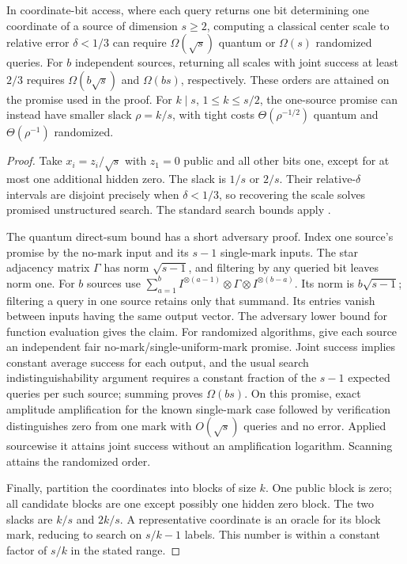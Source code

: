 \begin{proposition}
\label{newt:scale}
In coordinate-bit access, where each query returns one bit determining
one coordinate of a source of dimension $s\geq2$, computing a classical
center scale to relative error $\delta<1/3$ can require
$\Omega(\sqrt s)$ quantum or $\Omega(s)$ randomized queries.
For $b$ independent sources, returning all scales with joint success at
least $2/3$ requires $\Omega(b\sqrt s)$ and $\Omega(bs)$,
respectively.  These orders are attained on the promise used in the proof.
For $k\mid s$, $1\leq k\leq s/2$, the one-source promise can instead
have smaller slack $\rho=k/s$, with tight costs
$\Theta(\rho^{-1/2})$ quantum and $\Theta(\rho^{-1})$ randomized.
\end{proposition}
\begin{proof}
Take $x_i=z_i/\sqrt s$ with $z_1=0$ public and all other bits one,
except for at most one additional hidden zero.  The slack is $1/s$ or
$2/s$.  Their relative-$\delta$ intervals are disjoint precisely when
$\delta<1/3$, so recovering the scale solves promised unstructured
search.  The standard search bounds apply \citep{BBBV1997,BHMT2002}.

The quantum direct-sum bound has a short adversary proof.  Index
one source's promise by the no-mark input and its $s-1$ single-mark
inputs.  The star adjacency matrix $\Gamma$ has norm $\sqrt{s-1}$,
and filtering by any queried bit leaves norm one.  For $b$ sources use
$\sum_{a=1}^b I^{\otimes(a-1)}\otimes\Gamma\otimes
I^{\otimes(b-a)}$.  Its norm is $b\sqrt{s-1}$; filtering a query in
one source retains only that summand.  Its entries vanish between inputs
having the same output vector.  The adversary lower bound for function
evaluation \citep{LMRSS2011} gives the claim.  For randomized algorithms,
give each source an independent fair no-mark/single-uniform-mark promise.
Joint success implies constant average success for each output, and the
usual search indistinguishability argument requires a constant fraction
of the $s-1$ expected queries per such source; summing proves $\Omega(bs)$.
On this promise, exact amplitude amplification for the known single-mark
case followed by verification distinguishes zero from one mark with
$O(\sqrt s)$ queries and no error.  Applied sourcewise it attains joint
success without an amplification logarithm.  Scanning attains the
randomized order.

Finally, partition the coordinates into blocks of size $k$.  One public block
is zero; all candidate blocks are one except possibly one hidden zero
block.  The two slacks are $k/s$ and $2k/s$.  A representative coordinate
is an oracle for its block mark, reducing to search on $s/k-1$ labels.
This number is within a constant factor of $s/k$ in the stated range.
\end{proof}


